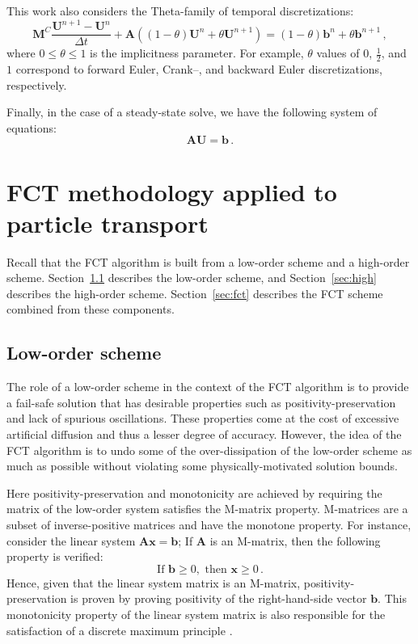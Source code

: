 \documentclass[xchauthor,chkrefs,fixeqskip,GCNS,amsmath,amsthm]{yjcphg}
\theoremstyle{remark}
\begin{document}
This work also considers the Theta-family of temporal discretizations:
%
\begin{equation}
\mathbf{M}^{C}\frac{\mathbf{U}^{n+1}-\mathbf{U}^{n}}{\Delta t} +
\mathbf{A}((1-\theta)\mathbf{U}^{n} + \theta\mathbf{U}^{n+1})
= (1-
\theta)\mathbf{b}^{n} + \theta\mathbf{b}^{n+1} \,,
\end{equation}
%
where $0\leq\theta\leq1$ is the implicitness parameter. For example,
$\theta$ values of $0$, $\frac{1}{2}$, and $1$ correspond to forward
Euler, Crank--, and backward Euler discretizations, respectively.

Finally, in the case of a steady-state solve, we have the following
system of equations:
%
\begin{equation}
\mathbf{A}\mathbf{U}= \mathbf{b}\,.
\end{equation}

\section{FCT methodology applied to particle transport}%
\label{sec:methodology}

Recall that the FCT algorithm is built from a low-order scheme and a
high-order scheme. Section~\ref{sec:low} describes the low-order scheme,
and Section~\ref{sec:high} describes the high-order scheme. Section~\ref{sec:fct} describes the FCT scheme combined from these components.

\subsection{Low-order scheme}%
\label{sec:low}

The role of a low-order scheme in the context of the FCT algorithm is
to provide a fail-safe solution that has desirable properties such as
positivity-preservation and lack of spurious oscillations. These
properties come at the cost of excessive artificial diffusion and thus
a lesser degree of accuracy. However, the idea of the FCT algorithm is
to undo some of the over-dissipation of the low-order scheme as much as
possible without violating some physically-motivated solution bounds.

Here positivity-preservation and monotonicity are achieved by requiring
 the matrix of the low-order system satisfies the M-matrix
property. M-matrices are a subset of inverse-positive matrices and have
the monotone property. For instance, consider the linear system
$\mathbf{A}\mathbf{x}= \mathbf{b}$; If $\mathbf{A}$ is an M-matrix, then
the following property is verified:
%
\begin{equation}
\text{If } \mathbf{b}\geq0, \text{ then } \mathbf{x}\geq0 \,.
\end{equation}
%
Hence, given that the linear system matrix is an M-matrix,
positivity-preservation is proven by proving positivity of the
right-hand-side vector $\mathbf{b}$. This monotonicity property of the
linear system matrix is also responsible for the satisfaction of a
discrete maximum principle \cite{guermond_firstorder}.
\end{document}
